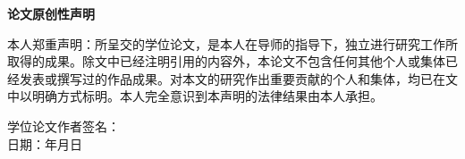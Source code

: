 	






\begin{center}
	\vspace*{20pt}
	\bfseries 论文原创性声明
\end{center}
\fontsize{15}{20}\selectfont

本人郑重声明：所呈交的学位论文，是本人在导师的指导下，独立进行研究工作所取得的成果。除文中已经注明引用的内容外，本论文不包含任何其他个人或集体已经发表或撰写过的作品成果。对本文的研究作出重要贡献的个人和集体，均已在文中以明确方式标明。本人完全意识到本声明的法律结果由本人承担。
\vskip 10pt
\begin{flushleft}
	\hfill 学位论文作者签名：\makebox[6em]{} \\
	\hfill 日期：\hspace{1em}年\hspace{1em}月\hspace{1em}日
\end{flushleft}

